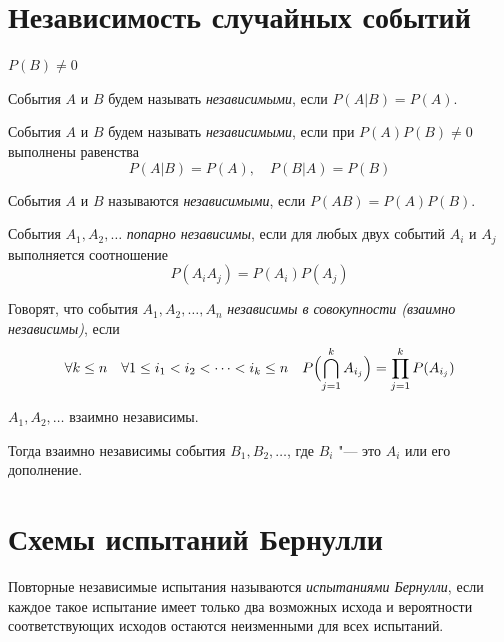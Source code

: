 \section{Независимость случайных событий}

\begin{definition}
	$ P(B) \ne 0 $

	События $ A $ и $ B $ будем называть \emph{независимыми}, если $ P(A|B) = P(A) $.
\end{definition}

\begin{definition}
	События $ A $ и $ B $ будем называть \emph{независимыми}, если при $ P(A)P(B) \ne 0 $ выполнены
	равенства
	$$ P(A|B) = P(A), \quad P(B|A) = P(B) $$
\end{definition}

\begin{definition}
	События $ A $ и $ B $ называются \emph{независимыми}, если $ P(AB) = P(A)P(B) $.
\end{definition}

\begin{definition}
	События $ A_1, A_2, \dotsc $ \emph{попарно независимы}, если для любых двух событий $ A_i $ и
	$ A_j $ выполняется соотношение
	$$ P(A_iA_j) = P(A_i)P(A_j) $$
\end{definition}

\begin{definition}
	Говорят, что события $ A_1, A_2, \dots, A_n $ \emph{независимы в совокупности (взаимно
	независимы)}, если
	$$ \forall k \le n \quad \forall 1 \le i_1 < i_2 < \dots < i_k \le n \quad
	P \Bigl( \bigcap_{j = 1}^k A_{i_j} \Bigr) = \prod_{j = 1}^k P(A_{i_j}) $$
\end{definition}

\begin{theorem}
	$ A_1, A_2, \dotsc $ взаимно независимы.

	Тогда взаимно независимы события $ B_1, B_2, \dotsc $, где $ B_i $ "--- это $ A_i $ или его
	дополнение.
\end{theorem}

\section{Схемы испытаний Бернулли}

\begin{definition}
	Повторные независимые испытания называются \emph{испытаниями Бернулли}, если каждое такое
	испытание имеет только два возможных исхода и вероятности соответствующих исходов остаются
	неизменными для всех испытаний.
\end{definition}

